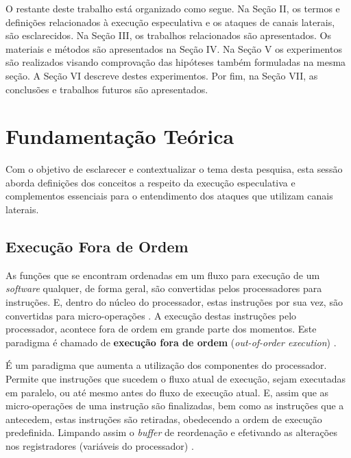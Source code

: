 \documentclass[conference]{IEEEtran}
\begin{document}
O restante deste trabalho está organizado como segue. Na Seção II, os termos e definições relacionados à execução especulativa e os ataques de canais laterais, são esclarecidos. Na Seção III, os trabalhos relacionados são apresentados. Os materiais e métodos são apresentados na Seção IV. Na Seção V os experimentos são realizados visando comprovação das hipóteses também formuladas na mesma seção. A Seção VI descreve destes experimentos. Por fim, na Seção VII, as conclusões e trabalhos futuros são apresentados.

\section{Fundamentação Teórica}
Com o objetivo de esclarecer e contextualizar o tema desta pesquisa, esta sessão aborda definições dos conceitos a respeito da execução especulativa e complementos essenciais para o entendimento dos ataques que utilizam canais laterais.
\subsection{Execução Fora de Ordem}
As funções que se encontram ordenadas em um fluxo para execução de um \emph{software} qualquer, de forma geral, são convertidas pelos processadores para instruções. E, dentro do núcleo do processador, estas instruções por sua vez, são convertidas para micro-operações \cite{Alisson2017Introducao}. A execução destas instruções pelo processador, acontece fora de ordem em grande parte dos momentos. Este paradigma é chamado de \textbf{execução fora de ordem} (\emph{out-of-order execution}) \cite{Fog2017Microarchitecture}.

É um paradigma que aumenta a utilização dos componentes do processador. Permite que instruções que sucedem o fluxo atual de execução, sejam executadas em paralelo, ou até mesmo antes do fluxo de execução atual. E, assim que as micro-operações de uma instrução são finalizadas, bem como as instruções que a antecedem, estas instruções são retiradas, obedecendo a ordem de execução predefinida. Limpando assim o \emph{buffer} de reordenação e efetivando as alterações nos registradores (variáveis do processador) \cite{Kocher2018Spectre}.

\end{document}
